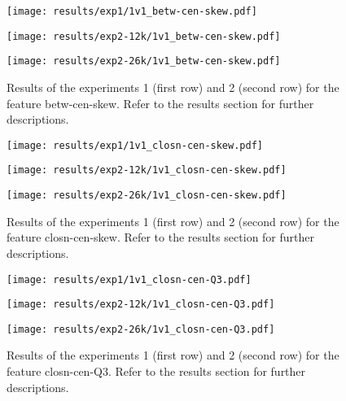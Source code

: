 \begin{figure}[h!]
    \centering
	\begin{minipage}{0.3\linewidth}
		\texttt{[image: results/exp1/1v1\_betw-cen-skew.pdf]}
	\end{minipage}

	\begin{minipage}{0.3\linewidth}
		\texttt{[image: results/exp2-12k/1v1\_betw-cen-skew.pdf]}
	\end{minipage}
	\begin{minipage}{0.3\linewidth}
		\texttt{[image: results/exp2-26k/1v1\_betw-cen-skew.pdf]}
	\end{minipage}

	\caption[ Results: Feature betw-cen-skew]{ Results of the experiments 1 (first row) and 2 (second row) for the feature betw-cen-skew. Refer to the results section for further descriptions. }
	\label{fig:appendix_betw-cen-skew}
\end{figure}
 \newpage 

 
\begin{figure}[h!]
    \centering
	\begin{minipage}{0.3\linewidth}
		\texttt{[image: results/exp1/1v1\_closn-cen-skew.pdf]}
	\end{minipage}

	\begin{minipage}{0.3\linewidth}
		\texttt{[image: results/exp2-12k/1v1\_closn-cen-skew.pdf]}
	\end{minipage}
	\begin{minipage}{0.3\linewidth}
		\texttt{[image: results/exp2-26k/1v1\_closn-cen-skew.pdf]}
	\end{minipage}

	\caption[ Results: Feature closn-cen-skew]{ Results of the experiments 1 (first row) and 2 (second row) for the feature closn-cen-skew. Refer to the results section for further descriptions. }
	\label{fig:appendix_closn-cen-skew}
\end{figure}
 
\begin{figure}[h!]
    \centering
	\begin{minipage}{0.3\linewidth}
		\texttt{[image: results/exp1/1v1\_closn-cen-Q3.pdf]}
	\end{minipage}

	\begin{minipage}{0.3\linewidth}
		\texttt{[image: results/exp2-12k/1v1\_closn-cen-Q3.pdf]}
	\end{minipage}
	\begin{minipage}{0.3\linewidth}
		\texttt{[image: results/exp2-26k/1v1\_closn-cen-Q3.pdf]}
	\end{minipage}

	\caption[ Results: Feature closn-cen-Q3]{ Results of the experiments 1 (first row) and 2 (second row) for the feature closn-cen-Q3. Refer to the results section for further descriptions. }
	\label{fig:appendix_closn-cen-Q3}
\end{figure}
 \newpage 

